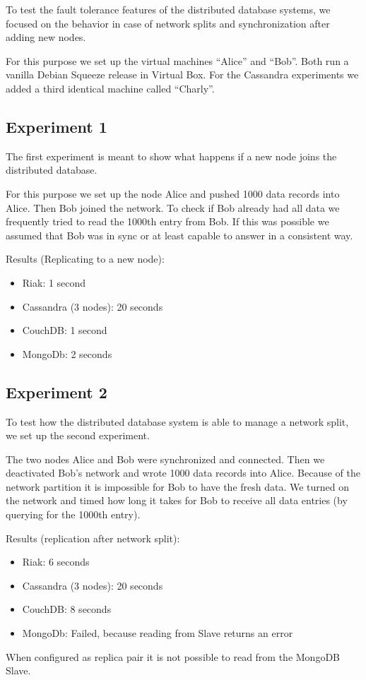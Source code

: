To test the fault tolerance features of the distributed database
systems, we focused on the behavior in case of network splits and
synchronization after adding new nodes.

For this purpose we set up the virtual machines ``Alice'' and
``Bob''. Both run a vanilla Debian Squeeze release in Virtual Box.
For the Cassandra experiments we added a third identical machine
called ``Charly''.

\subsection{Experiment 1}

The first experiment is meant to show what happens if a new node
joins the distributed database.

For this purpose we set up the node Alice and pushed 1000 data
records into Alice. Then Bob joined the network. To check if Bob
already had all data we frequently tried to read the 1000th entry
from Bob. If this was possible we assumed that Bob was in sync or
at least capable to answer in a consistent way.

Results (Replicating to a new node):

\begin{itemize}
\item
  Riak: 1 second
\item
  Cassandra (3 nodes): 20 seconds
\item
  CouchDB: 1 second
\item
  MongoDb: 2 seconds
\end{itemize}
\subsection{Experiment 2}

To test how the distributed database system is able to manage a
network split, we set up the second experiment.

The two nodes Alice and Bob were synchronized and connected. Then
we deactivated Bob's network and wrote 1000 data records into
Alice. Because of the network partition it is impossible for Bob to
have the fresh data. We turned on the network and timed how long it
takes for Bob to receive all data entries (by querying for the
1000th entry).

Results (replication after network split):

\begin{itemize}
\item
  Riak: 6 seconds
\item
  Cassandra (3 nodes): 20 seconds
\item
  CouchDB: 8 seconds
\item
  MongoDb: Failed, because reading from Slave returns an error
\end{itemize}
When configured as replica pair it is not possible to read from the
MongoDB Slave.

